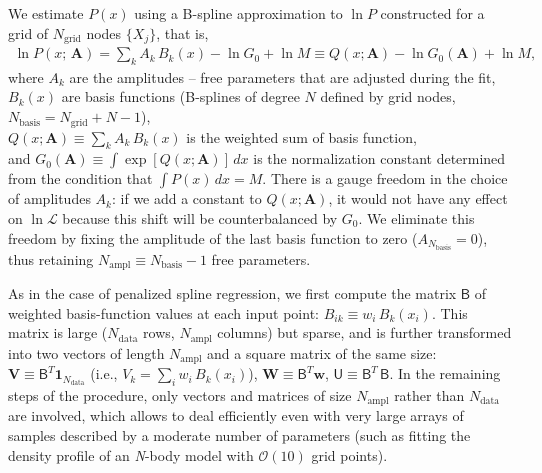 \documentclass[12pt]{article}
\newcommand{\Nbody}{\textsl{N}-body\xspace}
\newcommand{\bA}{\boldsymbol{A}}
\begin{document}
We estimate $P(x)$ using a B-spline approximation to $\ln P$ constructed for a grid of $N_\mathrm{grid}$ nodes $\{X_j\}$, that is,
\begin{align}
\ln P(x;\,\bA) = \sum_k  A_k\, B_k(x) - \ln G_0 + \ln M \equiv Q(x; \bA) - \ln G_0(\bA) + \ln M ,
\end{align}
where $A_k$ are the amplitudes -- free parameters that are adjusted during the fit,\\
$B_k(x)$  are  basis functions (B-splines of degree $N$ defined by grid nodes, $N_\mathrm{basis} = N_\mathrm{grid}+N-1$),\\
$Q(x; \bA) \equiv \sum_k  A_k\, B_k(x)$  is the weighted sum of basis function, \\
and $G_0(\bA) \equiv \int \exp[Q(x; \bA)]\, dx$  is the normalization constant determined from the condition that $\int P(x)\,dx = M$.
There is a gauge freedom in the choice of amplitudes $A_k$: if we add a constant to $Q(x; \bA)$, it would not have any effect on $\ln\mathcal{L}$ because this shift will be counterbalanced by $G_0$. We eliminate this freedom by fixing the amplitude of the last basis function to zero ($A_{N_\mathrm{basis}}=0$), thus retaining $N_\mathrm{ampl}\equiv N_\mathrm{basis}-1$ free parameters.

As in the case of penalized spline regression, we first compute the matrix $\mathsf{B}$ of weighted basis-function values at each input point: $B_{ik} \equiv w_i\,B_k(x_i)$. This matrix is large ($N_\mathrm{data}$ rows, $N_\mathrm{ampl}$ columns) but sparse, and is further transformed into two vectors of length $N_\mathrm{ampl}$ and a square matrix of the same size:
$\boldsymbol{V} \equiv \mathsf{B}^T\boldsymbol{1}_{N_\mathrm{data}}$ (i.e., $V_k = \sum_i w_i\,B_k(x_i)$), $\boldsymbol{W} \equiv \mathsf{B}^T\boldsymbol{w}$, $\mathsf{U} \equiv \mathsf{B}^T\,\mathsf{B}$. In the remaining steps of the procedure, only vectors and matrices of size $N_\mathrm{ampl}$ rather than $N_\mathrm{data}$ are involved, which allows to deal efficiently even with very large arrays of samples described by a moderate number of parameters (such as fitting the density profile of an \Nbody model with $\mathcal{O}(10)$ grid points).
\end{document}
